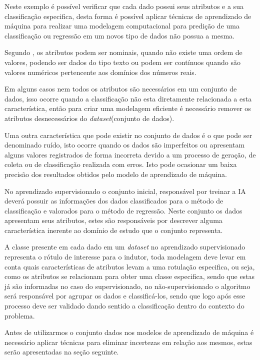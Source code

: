 \documentclass[
12pt,				%
oneside,			%
a4paper,			%
english,			%
french,				%
spanish,			%
brazil				%
]{abntex2}
\begin{document}
Neste exemplo é possível verificar que cada dado possui seus atributos e a sua classificação especifica, desta forma é possível aplicar técnicas de aprendizado de máquina para realizar uma modelagem computacional para predição de uma classificação ou regressão  em um novos tipo de dados não possua a mesma.

Segundo \cite{monard2003conceitos}, os atributos podem ser nominais, quando não existe uma ordem de valores, podendo ser dados do tipo texto ou podem ser contínuos quando são valores numéricos pertencente aos domínios dos números reais.

Em alguns casos nem todos os atributos são necessários em um conjunto de dados, isso ocorre quando a classificação não esta diretamente relacionada a esta característica, então para criar uma modelagem eficiente é necessário remover os atributos desnecessários do \textit{dataset}(conjunto de dados)\cite{kaufman1998discovery}.

Uma outra característica que pode existir no conjunto de dados é o que pode ser denominado ruído, isto ocorre quando os dados são imperfeitos ou apresentam alguns valores registrados de forma incorreta devido a um processo de geração, de coleta ou de classificação realizada com erros. Isto pode ocasionar um baixa precisão dos resultados obtidos pelo modelo de aprendizado de máquina.

No aprendizado supervisionado o conjunto inicial, responsável por treinar a IA deverá possuir as informações dos dados classificados para o método de classificação e valorados para o método de regressão. Neste conjunto os dados apresentam seus atributos, estes são responsáveis por descrever alguma característica inerente ao domínio de estudo que o conjunto representa.

A classe presente em cada dado em um \textit{dataset} no aprendizado supervisionado representa o rótulo de interesse para o indutor, toda modelagem deve levar em conta quais características de atributos levam a uma rotulação especifica, ou seja, como os atributos se relacionam para obter uma classe especifica, sendo que estas já são informadas no caso do supervisionado, no não-supervisionado o algoritmo será responsável por agrupar os dados e classificá-los, sendo que logo após esse processo deve ser validado dando sentido a classificação dentro do contexto do problema.

Antes de utilizarmos o conjunto dados nos modelos de aprendizado de máquina é necessário aplicar técnicas para eliminar incertezas em relação aos mesmos, estas serão apresentadas na seção seguinte.
\end{document}

